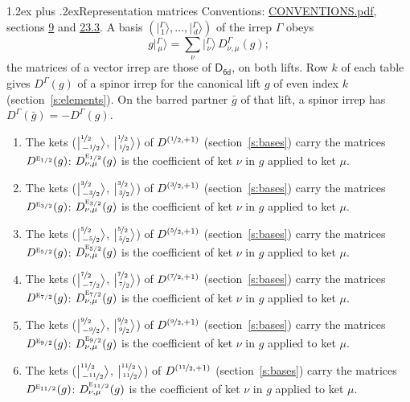 \documentclass[10pt,a4paper]{article}
\makeatletter
\renewcommand\section{\@startsection{section}{1}{\z@}{-3ex plus -1ex minus -.2ex}%
  {1.2ex plus .2ex}{\normalfont\large\sffamily\bfseries\color{parttitle}}}
\numberwithin{equation}{section}
\newcommand{\grp}[1]{\mathsf{#1}}
\newcommand{\irr}[1]{\text{\normalfont\scshape #1}}
\newcommand{\irrJp}[2]{D^{(#1,#2)}}
\newcommand{\repD}[1]{D^{#1}}
\newcommand{\intx}{\mu}
\newcommand{\jm}[2]{\bigl\lvert{}^{#1}_{\,#2}\bigr\rangle}
\newcommand{\irket}[2]{\bigl\lvert{}^{#1}_{\,#2}\bigr\rangle}
\newcommand{\barred}[1]{\bar{#1}}
\newenvironment{romanlist}{\begin{enumerate}%
\renewcommand{\labelenumi}{(\roman{enumi})}}%
  {\end{enumerate}}
\makeatother
\begin{document}
\section{Representation matrices}\label{s:irrep_matrices}
Conventions: \href{../../CONVENTIONS.pdf}{CONVENTIONS.pdf}, sections \href{../../../rotation/CONVENTIONS.pdf\#conv.9}{9} and \href{../../CONVENTIONS.pdf\#conv.23.3}{23.3}.
\leavevmode\label{n:vector.ket.partner}\label{n:index.partner}\label{n:matrix.irrep}\label{n:index.partner.summed}A basis $(\irket{\Gamma}{1}, \dots, \irket{\Gamma}{d})$ of the irrep $\Gamma$ obeys
\begin{equation}\label{e:partner}g\irket{\Gamma}{\intx} = \sum_\nu \irket{\Gamma}{\nu}\, \repD{\Gamma}_{\nu,\intx}(g);\end{equation}
the matrices of a vector irrep are those of \href{../../../rotation/data/pdf/D6d.pdf}{$\grp{D_{6d}}$}, on both lifts. Row $k$ of each table gives $\repD{\Gamma}(g)$ of a spinor irrep for the canonical lift $g$ of even index $k$ (section~\ref{s:elements}). On the barred partner $\barred{g}$ of that lift, a spinor irrep has $\repD{\Gamma}(\barred{g}) = -\repD{\Gamma}(g)$.
\begin{romanlist}\raggedright
\item The kets ($\jm{\nicefrac{1}{2}}{-\nicefrac{1}{2}}$, $\jm{\nicefrac{1}{2}}{\nicefrac{1}{2}}$) of $\irrJp{\nicefrac{1}{2}}{+1}$ (section~\ref{s:bases}) carry the matrices $\repD{\irr{e}_{1/2}}(g)$: $\repD{\irr{e}_{1/2}}_{\nu,\intx}(g)$ is the coefficient of ket $\nu$ in $g$ applied to ket $\intx$.
\item The kets ($\jm{\nicefrac{3}{2}}{-\nicefrac{3}{2}}$, $\jm{\nicefrac{3}{2}}{\nicefrac{3}{2}}$) of $\irrJp{\nicefrac{3}{2}}{+1}$ (section~\ref{s:bases}) carry the matrices $\repD{\irr{e}_{3/2}}(g)$: $\repD{\irr{e}_{3/2}}_{\nu,\intx}(g)$ is the coefficient of ket $\nu$ in $g$ applied to ket $\intx$.
\item The kets ($\jm{\nicefrac{5}{2}}{-\nicefrac{5}{2}}$, $\jm{\nicefrac{5}{2}}{\nicefrac{5}{2}}$) of $\irrJp{\nicefrac{5}{2}}{+1}$ (section~\ref{s:bases}) carry the matrices $\repD{\irr{e}_{5/2}}(g)$: $\repD{\irr{e}_{5/2}}_{\nu,\intx}(g)$ is the coefficient of ket $\nu$ in $g$ applied to ket $\intx$.
\item The kets ($\jm{\nicefrac{7}{2}}{-\nicefrac{7}{2}}$, $\jm{\nicefrac{7}{2}}{\nicefrac{7}{2}}$) of $\irrJp{\nicefrac{7}{2}}{+1}$ (section~\ref{s:bases}) carry the matrices $\repD{\irr{e}_{7/2}}(g)$: $\repD{\irr{e}_{7/2}}_{\nu,\intx}(g)$ is the coefficient of ket $\nu$ in $g$ applied to ket $\intx$.
\item The kets ($\jm{\nicefrac{9}{2}}{-\nicefrac{9}{2}}$, $\jm{\nicefrac{9}{2}}{\nicefrac{9}{2}}$) of $\irrJp{\nicefrac{9}{2}}{+1}$ (section~\ref{s:bases}) carry the matrices $\repD{\irr{e}_{9/2}}(g)$: $\repD{\irr{e}_{9/2}}_{\nu,\intx}(g)$ is the coefficient of ket $\nu$ in $g$ applied to ket $\intx$.
\item The kets ($\jm{\nicefrac{11}{2}}{-\nicefrac{11}{2}}$, $\jm{\nicefrac{11}{2}}{\nicefrac{11}{2}}$) of $\irrJp{\nicefrac{11}{2}}{+1}$ (section~\ref{s:bases}) carry the matrices $\repD{\irr{e}_{11/2}}(g)$: $\repD{\irr{e}_{11/2}}_{\nu,\intx}(g)$ is the coefficient of ket $\nu$ in $g$ applied to ket $\intx$.
\end{romanlist}
\end{document}
